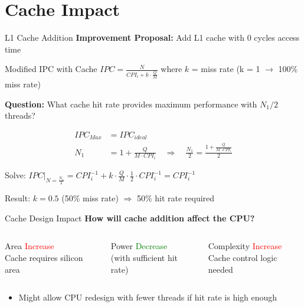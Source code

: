 \documentclass[aspectratio=169,12pt]{beamer}
\begin{document}
\section{Cache Impact}

\begin{frame}{L1 Cache Addition}
\textbf{Improvement Proposal:} Add L1 cache with 0 cycles access time

\begin{block}{Modified IPC with Cache}
$IPC = \frac{N}{CPI_i + k \cdot \frac{Q}{M}}$
where $k$ = miss rate (k = 1 $\rightarrow$ 100\% miss rate)
\end{block}

\textbf{Question:} What cache hit rate provides maximum performance with $N_1/2$ threads?

\begin{align*}
IPC_{Max} &= IPC_{ideal} \\
N_1 &= 1 + \frac{Q}{M \cdot CPI_i} \quad \Rightarrow \quad \frac{N_1}{2} = \frac{1 + \frac{Q}{M \cdot CPI_i}}{2}
\end{align*}

Solve: $IPC\Big|_{N=\frac{N_1}{2}} = CPI_i^{-1} + k \cdot \frac{Q}{M} \cdot \frac{1}{2} \cdot CPI_i^{-1} = CPI_i^{-1}$

\alert{Result: $k = 0.5$ (50\% miss rate) $\Rightarrow$ 50\% hit rate required}
\end{frame}

\begin{frame}{Cache Design Impact}
\textbf{How will cache addition affect the CPU?}

\begin{columns}
\begin{block}{Area}
\textcolor{red}{Increase} \\
Cache requires silicon area
\end{block}

\begin{block}{Power}
\textcolor{green}{Decrease} \\
(with sufficient hit rate)
\end{block}

\begin{block}{Complexity}
\textcolor{red}{Increase} \\
Cache control logic needed
\end{block}
\end{columns}

\vspace{0.5cm}
\begin{itemize}
    \item Might allow CPU redesign with fewer threads if hit rate is high enough
\end{itemize}
\end{frame}
\end{document}
